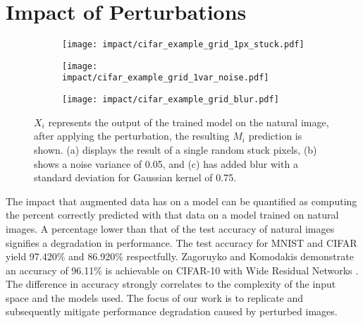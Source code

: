 \documentclass[conference]{IEEEtran}
\begin{document}
\section{Impact of Perturbations}
\label{sec:impact_of_perturb}

\begin{figure*}[!t]
    \centering
    \begin{subfigure}{0.305\linewidth}
        \centering
        \texttt{[image: impact/cifar\_example\_grid\_1px\_stuck.pdf]}
        \caption{}
        \label{fig:impact_visual_blur}
    \end{subfigure}
    \hspace{0.7em}
    \begin{subfigure}{0.33\linewidth}
        \centering
        \texttt{[image: impact/cifar\_example\_grid\_1var\_noise.pdf]}
        \caption{}
        \label{fig:impact_visual_noise}
    \end{subfigure}
    \hspace{0.7em}
    \begin{subfigure}{0.305\linewidth}
        \centering
        \texttt{[image: impact/cifar\_example\_grid\_blur.pdf]}
        \caption{}
        \label{fig:impact_visual_pixel}
    \end{subfigure}
    \captionsetup{width=0.90\linewidth}
    \caption{$X_i$ represents the output of the trained model on the natural image, after applying the perturbation, the resulting $M_i$ prediction is shown. (a) displays the result of a single random stuck pixels, (b) shows a noise variance of 0.05, and (c) has added blur with a standard deviation for Gaussian kernel of 0.75.}
    \label{fig:impact_visual_all}
\end{figure*}

The impact that augmented data has on a model can be quantified as computing the percent correctly predicted with that data on a model trained on natural images. A percentage lower than that of the test accuracy of natural images signifies a degradation in performance. The test accuracy for MNIST and CIFAR yield 97.420\% and 86.920\% respectfully. Zagoruyko and Komodakis demonstrate an accuracy of 96.11\% is achievable on CIFAR-10 with Wide Residual Networks \cite{Zagoruyko2016wideresnet}. The difference in accuracy strongly correlates to the complexity of the input space and the models used. The focus of our work is to replicate and subsequently mitigate performance degradation caused by perturbed images.
\end{document}
